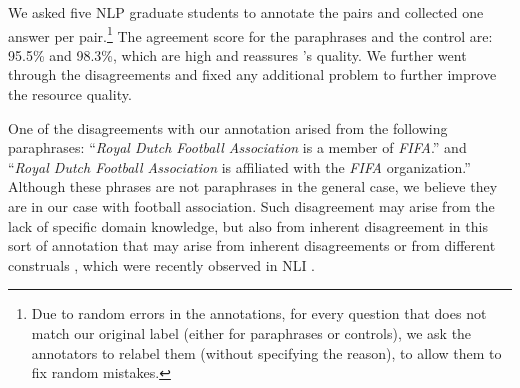 We asked five NLP graduate students to  annotate the pairs and collected one answer per pair.\footnote{Due to random errors in the annotations, for every question
that does not match our original label (either for
paraphrases or controls), we ask the annotators to relabel
them (without specifying the reason), to allow them to fix
random mistakes.}
The agreement score for the paraphrases and the control are: 95.5\% and 98.3\%, which are high and reassures \resource's quality.
We further went through the disagreements  %
and fixed any additional problem %
to further improve the resource quality.
% 

One of the disagreements with our annotation arised from the following paraphrases: ``\textit{Royal Dutch Football Association} is a member of \textit{FIFA}.'' and ``\textit{Royal Dutch Football Association} is affiliated with the \textit{FIFA} organization.''
Although these phrases are not paraphrases in the general case, we believe they are in our case with football association. Such disagreement may arise from the lack of specific domain knowledge, but also from inherent disagreement in this sort of annotation that may arise from inherent disagreements \cite{pavlick2019inherent} or from different construals \cite{trott2020re}, which were recently observed in NLI \cite{elazar2020extraordinary}.
